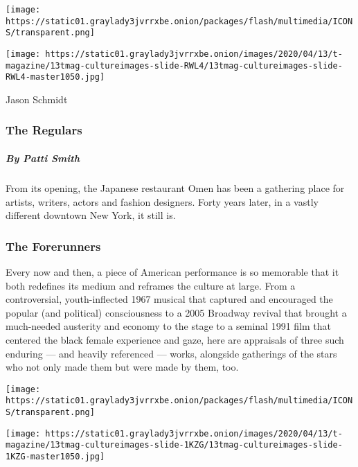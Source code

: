 \href{https://www.nytimes3xbfgragh.onion/interactive/2020/04/13/t-magazine/omen-restaurant-nyc.html}{}

\texttt{[image: https://static01.graylady3jvrrxbe.onion/packages/flash/multimedia/ICONS/transparent.png]}

\texttt{[image: https://static01.graylady3jvrrxbe.onion/images/2020/04/13/t-magazine/13tmag-cultureimages-slide-RWL4/13tmag-cultureimages-slide-RWL4-master1050.jpg]}

Jason Schmidt

\hypertarget{the-regulars}{%
\subsubsection{The Regulars}\label{the-regulars}}

\hypertarget{by-patti-smith}{%
\subparagraph{By Patti Smith}\label{by-patti-smith}}

From its opening, the Japanese restaurant Omen has been a gathering
place for artists, writers, actors and fashion designers. Forty years
later, in a vastly different downtown New York, it still is.

\hypertarget{the-forerunners}{%
\subsubsection{The Forerunners}\label{the-forerunners}}

Every now and then, a piece of American performance is so memorable that
it both redefines its medium and reframes the culture at large. From a
controversial, youth-inflected 1967 musical that captured and encouraged
the popular (and political) consciousness to a 2005 Broadway revival
that brought a much-needed austerity and economy to the stage to a
seminal 1991 film that centered the black female experience and gaze,
here are appraisals of three such enduring --- and heavily referenced
--- works, alongside gatherings of the stars who not only made them but
were made by them, too.

\href{https://www.nytimes3xbfgragh.onion/interactive/2020/04/13/t-magazine/hair-musical-broadway.html}{}

\texttt{[image: https://static01.graylady3jvrrxbe.onion/packages/flash/multimedia/ICONS/transparent.png]}

\texttt{[image: https://static01.graylady3jvrrxbe.onion/images/2020/04/13/t-magazine/13tmag-cultureimages-slide-1KZG/13tmag-cultureimages-slide-1KZG-master1050.jpg]}

